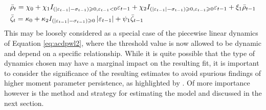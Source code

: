 \begin{equation}\label{eq:acdxar}
\begin{gathered}
{\bar \rho _t} = {\chi _0} + {\chi _1}{{I}_{\left( {\left| {{\varepsilon _{t - 1}}} \right| - {\sigma _{t - 1}}} \right) \geqslant 0,{\varepsilon _{t - 1}} < 0}}{\varepsilon _{t - 1}} + {\chi _2}{{I}_{\left( {\left| {{\varepsilon _{t - 1}}} \right| - {\sigma _{t - 1}}} \right) \geqslant 0,{\varepsilon _{t - 1}} \geqslant 0}}{\varepsilon _{t - 1}} + {\xi _1}{\bar \rho _{t - 1}}\hfill \\
{{\bar \zeta }_t} = {\kappa _0} + {\kappa _2}{{I}_{\left( {\left| {{\varepsilon _{t - 1}}} \right| - {\sigma _{t - 1}}} \right) \geqslant 0}}\left| {{\varepsilon _{t - 1}}} \right| + {\psi _1}{{\bar \zeta }_{t - 1}}\hfill \\
\end{gathered}
\end{equation}
This may be loosely considered as a special case of the piecewise linear dynamics of Equation \ref{eq:acdpwl2}, where the threshold value is now allowed to be dynamic and depend on a specific relationship. While it is quite possible that the type of dynamics chosen may have a marginal impact on the resulting fit, it is important to consider the significance of the resulting estimates to avoid spurious findings of higher moment parameter persistence, as highlighted by \citet{Jondeau2003}. Of more importance however is the method and strategy for estimating the model and discussed in the next section.
